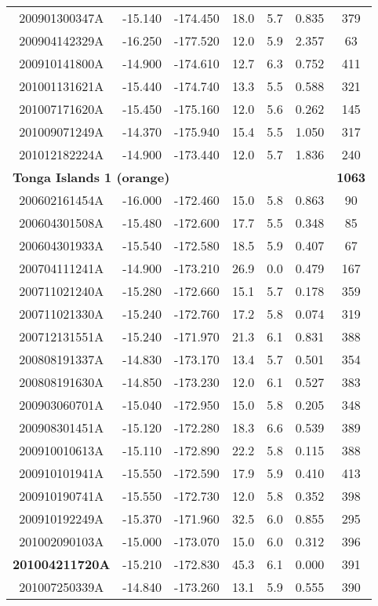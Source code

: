 \documentclass[12pt,oneside]{book}
\begin{document}
\begin{longtable}{ c c c c c c c }
200901300347A &-15.140 &-174.450 &18.0 &5.7 &0.835 &379 \\
200904142329A &-16.250 &-177.520 &12.0 &5.9 &2.357 &63 \\
200910141800A &-14.900 &-174.610 &12.7 &6.3 &0.752 &411 \\
201001131621A &-15.440 &-174.740 &13.3 &5.5 &0.588 &321 \\
201007171620A &-15.450 &-175.160 &12.0 &5.6 &0.262 &145 \\
201009071249A &-14.370 &-175.940 &15.4 &5.5 &1.050 &317 \\
201012182224A &-14.900 &-173.440 &12.0 &5.7 &1.836 &240 \\ \hline 
\multicolumn{3}{l}{\textbf{Tonga Islands 1 (orange)}} & & & &\textbf{1063} \\
200602161454A &-16.000 &-172.460 &15.0 &5.8 &0.863 &90 \\
200604301508A &-15.480 &-172.600 &17.7 &5.5 &0.348 &85 \\
200604301933A &-15.540 &-172.580 &18.5 &5.9 &0.407 &67 \\
200704111241A &-14.900 &-173.210 &26.9 &0.0 &0.479 &167 \\
200711021240A &-15.280 &-172.660 &15.1 &5.7 &0.178 &359 \\
200711021330A &-15.240 &-172.760 &17.2 &5.8 &0.074 &319 \\
200712131551A &-15.240 &-171.970 &21.3 &6.1 &0.831 &388 \\
200808191337A &-14.830 &-173.170 &13.4 &5.7 &0.501 &354 \\
200808191630A &-14.850 &-173.230 &12.0 &6.1 &0.527 &383 \\
200903060701A &-15.040 &-172.950 &15.0 &5.8 &0.205 &348 \\
200908301451A &-15.120 &-172.280 &18.3 &6.6 &0.539 &389 \\
200910010613A &-15.110 &-172.890 &22.2 &5.8 &0.115 &388 \\
200910101941A &-15.550 &-172.590 &17.9 &5.9 &0.410 &413 \\
200910190741A &-15.550 &-172.730 &12.0 &5.8 &0.352 &398 \\
200910192249A &-15.370 &-171.960 &32.5 &6.0 &0.855 &295 \\
201002090103A &-15.000 &-173.070 &15.0 &6.0 &0.312 &396 \\
\textbf{201004211720A} &-15.210 &-172.830 &45.3 &6.1 &0.000 &391 \\
201007250339A &-14.840 &-173.260 &13.1 &5.9 &0.555 &390 \\

\end{longtable}
\end{document}
